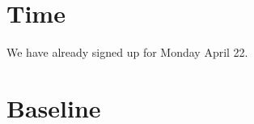 \documentclass[11pt]{article}
\begin{document}

\section{Time}

We have already signed up for Monday April 22.

\section{Baseline}




\end{document}
